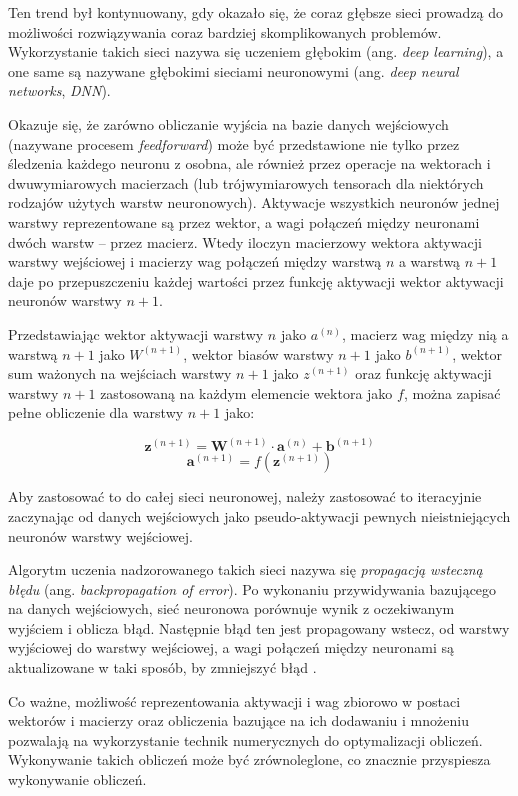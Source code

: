 Ten trend był kontynuowany, gdy okazało się, że coraz głębsze sieci prowadzą do możliwości rozwiązywania coraz bardziej skomplikowanych problemów.
Wykorzystanie takich sieci nazywa się uczeniem głębokim (ang. \emph{deep learning}), a one same są nazywane głębokimi sieciami neuronowymi (ang. \emph{deep neural networks}, \emph{DNN}).

Okazuje się, że zarówno obliczanie wyjścia na bazie danych wejściowych (nazywane procesem \emph{feedforward}) może być przedstawione nie tylko przez śledzenia każdego neuronu z osobna, ale również przez operacje na wektorach i dwuwymiarowych macierzach (lub trójwymiarowych tensorach dla niektórych rodzajów użytych warstw neuronowych).
Aktywacje wszystkich neuronów jednej warstwy reprezentowane są przez wektor, a wagi połączeń między neuronami dwóch warstw -- przez macierz.
Wtedy iloczyn macierzowy wektora aktywacji warstwy wejściowej i macierzy wag połączeń między warstwą $n$ a warstwą $n+1$ daje po przepuszczeniu każdej wartości przez funkcję aktywacji wektor aktywacji neuronów warstwy $n+1$.

Przedstawiając wektor aktywacji warstwy $n$ jako $a^{(n)}$, macierz wag między nią a warstwą $n+1$ jako $W^{(n+1)}$, wektor biasów warstwy $n+1$ jako $b^{(n+1)}$, wektor sum ważonych na wejściach warstwy $n+1$ jako $z^{(n+1)}$ oraz funkcję aktywacji warstwy $n+1$ zastosowaną na każdym elemencie wektora jako $f$, można zapisać pełne obliczenie dla warstwy $n+1$ jako:

\[
  \mathbf{z}^{(n+1)} = \mathbf{W}^{(n+1)} \cdot \mathbf{a}^{(n)} + \mathbf{b}^{(n+1)}
\]
\[
  \mathbf{a}^{(n+1)} = f(\mathbf{z}^{(n+1)})
\]

Aby zastosować to do całej sieci neuronowej, należy zastosować to iteracyjnie zaczynając od danych wejściowych jako pseudo-aktywacji pewnych nieistniejących neuronów warstwy wejściowej.

Algorytm uczenia nadzorowanego takich sieci nazywa się \emph{propagacją wsteczną błędu} (ang. \emph{backpropagation of error}).
Po wykonaniu przywidywania bazującego na danych wejściowych, sieć neuronowa porównuje wynik z oczekiwanym wyjściem i oblicza błąd.
Następnie błąd ten jest propagowany wstecz, od warstwy wyjściowej do warstwy wejściowej, a wagi połączeń między neuronami są aktualizowane w taki sposób, by zmniejszyć błąd \cite{rojas1996backpropagation}.

Co ważne, możliwość reprezentowania aktywacji i wag zbiorowo w postaci wektorów i macierzy oraz obliczenia bazujące na ich dodawaniu i mnożeniu pozwalają na wykorzystanie technik numerycznych do optymalizacji obliczeń.
Wykonywanie takich obliczeń może być zrównoleglone, co znacznie przyspiesza wykonywanie obliczeń.

